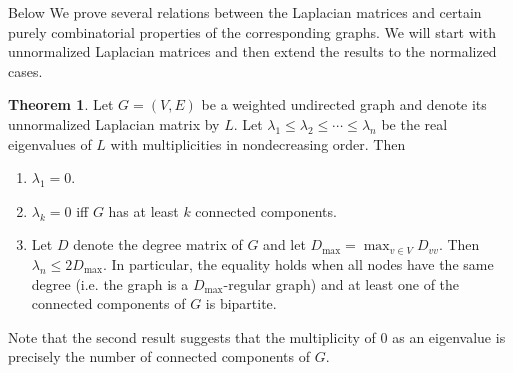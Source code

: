 \documentclass[a4paper]{article}
\theoremstyle{definition}
\newtheorem{theorem}{Theorem}[section]
\begin{document}
Below We prove several relations between the Laplacian matrices and certain purely combinatorial properties of the corresponding graphs. We will start with unnormalized Laplacian matrices and then extend the results to the normalized cases.

\begin{theorem} Let $G=(V, E)$ be a weighted undirected graph and denote its unnormalized Laplacian matrix by $L$. Let $\lambda_1\leq \lambda_2\leq \cdots\leq \lambda_n$ be the real eigenvalues of $L$ with multiplicities in nondecreasing order. Then
\begin{enumerate}
    \item $\lambda_1=0$.
    \item $\lambda_k=0$ iff $G$ has at least $k$ connected components.
    \item Let $D$ denote the degree matrix of $G$ and let $D_{\max}=\max_{v\in V}D_{vv}$. Then $\lambda_n\leq 2D_{\max}$. In particular, the equality holds when all nodes have the same degree (i.e. the graph is a $D_{\max}$-regular graph) and at least one of the connected components of $G$ is bipartite.
\end{enumerate}
Note that the second result suggests that the multiplicity of $0$ as an eigenvalue is precisely the number of connected components of $G$.
\end{theorem}
\end{document}
